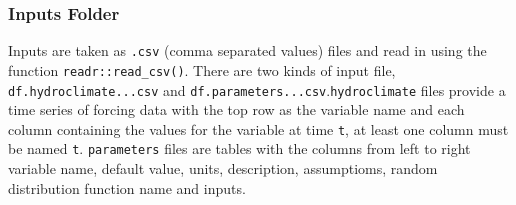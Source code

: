 \documentclass[
]{article}
\begin{document}
\hypertarget{inputs-folder}{%
\subsubsection{Inputs Folder}\label{inputs-folder}}

Inputs are taken as \texttt{.csv} (comma separated values) files and
read in using the function \texttt{readr::read\_csv()}. There are two
kinds of input file, \texttt{df.hydroclimate...csv} and
\texttt{df.parameters...csv}.\texttt{hydroclimate} files provide a time
series of forcing data with the top row as the variable name and each
column containing the values for the variable at time \texttt{t}, at
least one column must be named \texttt{t}. \texttt{parameters} files are
tables with the columns from left to right variable name, default value,
units, description, assumptioms, random distribution function name and
inputs.
\end{document}
